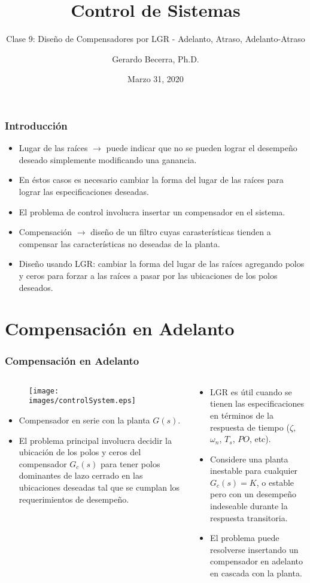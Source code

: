 \documentclass[aspectratio=169,handout]{beamer}
\title{Control de Sistemas}
\subtitle{\small Clase 9: Diseño de Compensadores por LGR - Adelanto, Atraso, Adelanto-Atraso}
\author{Gerardo Becerra, Ph.D.}
\institute{Pontificia Universidad Javeriana\\ Departamento de Electrónica}
\date{Marzo 31, 2020}
\theoremstyle{definition}
\theoremstyle{plain}
\theoremstyle{remark}
\begin{document}
\frame{\titlepage}	

\begin{frame}[<+->]\frametitle{Introducción}
\vspace*{5mm}
\centering
\begin{itemize}
	\item Lugar de las raíces $\rightarrow$ puede indicar que no se pueden lograr el desempeño deseado simplemente modificando una ganancia.
	\item En éstos casos es necesario cambiar la forma del lugar de las raíces para lograr las especificaciones deseadas.
	\item El problema de control involucra insertar un compensador en el sistema.
	\item Compensación $\rightarrow$ diseño de un filtro cuyas carasterísticas tienden a compensar las características no deseadas de la planta.
	\item Diseño usando LGR: cambiar la forma del lugar de las raíces agregando polos y ceros para forzar a las raíces a pasar por las ubicaciones de los polos deseados.
\end{itemize}
\end{frame}

\section{Compensación en Adelanto}
\begin{frame}[<+->]\frametitle{Compensación en Adelanto}
\begin{columns}
	\begin{column}{0.5\textwidth}
	\begin{figure}
		\texttt{[image: images/controlSystem.eps]}
	\end{figure}
	\vspace*{-3mm}
	\begin{itemize}
		\item Compensador en serie con la planta $G(s)$.
		\item El problema principal involucra decidir la ubicación de los polos y ceros del compensador $G_c(s)$ para tener polos dominantes de lazo cerrado en las ubicaciones deseadas tal que se cumplan los requerimientos de desempeño.
	\end{itemize}
	\end{column}
	\begin{column}{0.5\textwidth}
	\begin{itemize}
		\item LGR es útil cuando se tienen las especificaciones en términos de la respuesta de tiempo ($\zeta$, $\omega_n$, $T_s$, $PO$, etc).
		\item Considere una planta inestable para cualquier $G_c(s) = K$, o estable pero con un desempeño indeseable durante la respuesta transitoria.
		\item El problema puede resolverse insertando un compensador en adelanto en cascada con la planta.
	\end{itemize}
	\end{column}
\end{columns}
\end{frame}
\end{document}
